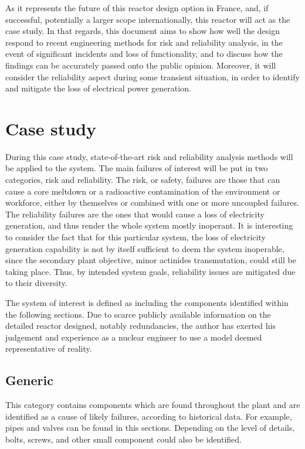 As it represents the future of this reactor design option in France, and, if successful, potentially a larger scope internationally, this reactor will act as the case study. In that regards, this document aims to show how well the design respond to recent engineering methods for risk and reliability analysis, in the event of significant incidents and loss of functionality, and to discuss how the findings can be accurately passed onto the public opinion. Moreover, it will consider the reliability aspect during some transient situation, in order to identify and mitigate the loss of electrical power generation.


\section{Case study}
\label{sec2:case_study}

During this case study, state-of-the-art risk and reliability analysis methods will be applied to the system. The main failures of interest will be put in two categories, risk and reliability. The risk, or safety, failures are those that can cause a core meltdown or a radioactive contamination of the environment or workforce, either by themselves or combined with one or more uncoupled failures. The reliability failures are the ones that would cause a loss of electricity generation, and thus render the whole system mostly inoperant. It is interesting to consider the fact that for this particular system, the loss of electricity generation capability is not by itself sufficient to deem the system inoperable, since the secondary plant objective, minor actinides transmutation, could still be taking place. Thus, by intended system goals, reliability issues are mitigated due to their diversity.

The system of interest is defined as including the components identified within the following sections. Due to scarce publicly available information on the detailed reactor designed, notably redundancies, the author has exerted his judgement and experience as a nuclear engineer to use a model deemed representative of reality.

\subsection{Generic}
\label{subsec2:generic}

This category contains components which are found throughout the plant and are identified as a cause of likely failures, according to historical data. For example, pipes and valves can be found in this sections. Depending on the level of details, bolts, screws, and other small component could also be identified.


